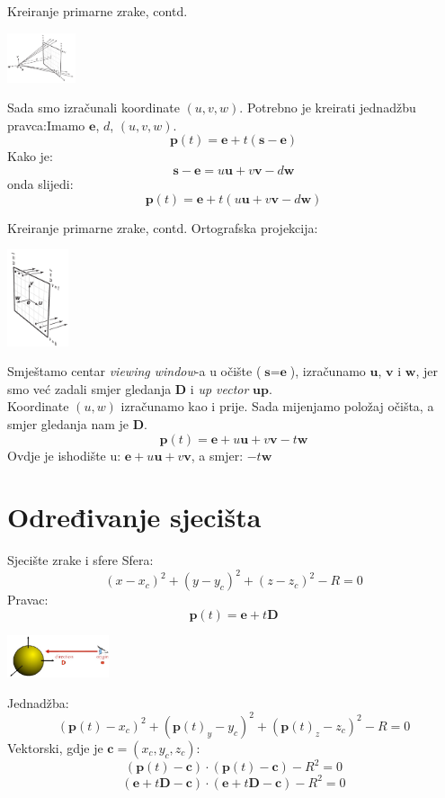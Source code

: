 \documentclass[9pt]{beamer}
\begin{document}
\begin{frame}{Kreiranje primarne zrake, contd.}
\begin{center}
\includegraphics[width=2cm]{slike/ray_viewing_window_perspective.png} 
\end{center} 
Sada smo izračunali koordinate $(u,v, w)$. Potrebno je kreirati jednadžbu pravca:Imamo $\textbf{e}$, $d$, $(u,v, w)$.
$$\textbf{p}(t) = \textbf{e} + t(\textbf{s} - \textbf{e})$$
Kako je:
$$\textbf{s} - \textbf{e} = u\textbf{u} + v\textbf{v} - d\textbf{w}$$
onda slijedi:
$$\textbf{p}(t) = \textbf{e} + t(u\textbf{u} + v\textbf{v} - d\textbf{w})$$
\end{frame}

\begin{frame}{Kreiranje primarne zrake, contd.}
Ortografska projekcija:
\begin{center}
\includegraphics[width=1.8cm]{slike/ray_viewing_window_orthografic.png} 
\end{center} 
Smještamo centar \textit{viewing window}-a u očište ($\textbf{s} = \textbf{e}$), izračunamo $\textbf{u}$, $\textbf{v}$ i $\textbf{w}$, jer smo već zadali smjer gledanja $\textbf{D}$ i \textit{up vector} $\textbf{up}$.\\
Koordinate $(u,w)$ izračunamo kao i prije. Sada mijenjamo položaj očišta, a smjer gledanja nam je $\textbf{D}$.
$$\textbf{p}(t) = \textbf{e} + u\textbf{u} + v\textbf{v} - t\textbf{w}$$
Ovdje je ishodište u: $\textbf{e} + u\textbf{u} + v\textbf{v}$, a smjer:
$- t\textbf{w}$
\end{frame}
\section{Određivanje sjecišta}
\begin{frame}{Sjecište zrake i sfere}
Sfera:
$$(x-x_c)^2 + (y-y_c)^2 + (z-z_c)^2 - R = 0$$
Pravac:
$$\textbf{p}(t) = \textbf{e}+t\textbf{D}$$
\begin{center}
	\includegraphics[width=3cm]{slike/ray_sfera.png}
\end{center}

Jednadžba:
$$(\textbf{p}(t)-x_c)^2 + (\textbf{p}(t)_y-y_c)^2 + (\textbf{p}(t)_z-z_c)^2 - R = 0$$
Vektorski, gdje je $\textbf{c}=(x_c, y_c, z_c)$:
$$(\textbf{p}(t)-\textbf{c})\cdot (\textbf{p}(t)-\textbf{c}) - R^2 = 0$$
$$(\textbf{e} + t\textbf{D}-\textbf{c})\cdot (\textbf{e} + t\textbf{D}-\textbf{c}) - R^2 = 0$$
\end{frame}	
\end{document}
